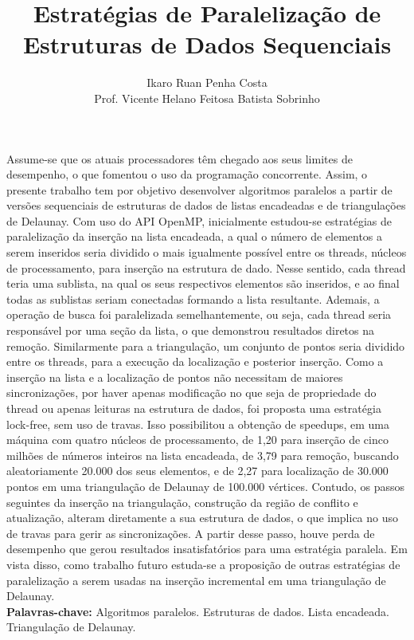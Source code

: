 \documentclass[a4paper, 12pt]{article}
\title{Estratégias de Paralelização de Estruturas de Dados Sequenciais}
\date{}
\author{Ikaro Ruan Penha Costa \\
	Prof. Vicente Helano Feitosa Batista Sobrinho}
\begin{document}
\maketitle

Assume-se que os atuais processadores têm chegado aos seus limites de desempenho, o que fomentou o uso da programação concorrente. 
Assim, o presente trabalho tem por objetivo desenvolver algoritmos paralelos a partir de versões sequenciais de estruturas de 
dados de listas encadeadas e de triangulações de Delaunay. Com uso do API OpenMP, inicialmente estudou-se estratégias de 
paralelização da inserção na lista encadeada, a qual o número de elementos a serem inseridos  seria dividido o mais igualmente 
possível entre os threads, núcleos de processamento, para inserção na estrutura de dado. Nesse sentido, cada thread teria uma sublista, 
na qual  os seus respectivos elementos são inseridos, e ao final todas as sublistas seriam conectadas formando a lista resultante. 
Ademais, a operação de busca foi paralelizada semelhantemente, ou seja, cada thread seria responsável por uma seção da lista, o 
que demonstrou resultados diretos na remoção.  Similarmente para a triangulação, um conjunto de pontos seria dividido entre os threads,
para a execução da localização e posterior inserção. Como a inserção na lista e a localização de pontos não necessitam de maiores 
sincronizações, por haver apenas modificação no que seja de propriedade do thread ou apenas leituras na estrutura de dados, 
foi proposta uma estratégia lock-free, sem uso de travas. Isso possibilitou a obtenção de speedups, em uma máquina com quatro 
núcleos de processamento, de 1,20 para inserção de cinco milhões de números inteiros na lista encadeada, de 3,79 para remoção, 
buscando aleatoriamente 20.000 dos seus elementos, e de 2,27 para localização de 30.000 pontos em uma triangulação de Delaunay 
de 100.000 vértices. Contudo, os passos seguintes da inserção na triangulação, construção da região de conflito e atualização,
alteram diretamente a sua estrutura de dados, o que implica no uso de travas para gerir as sincronizações. A partir desse passo,
houve perda de desempenho que gerou resultados insatisfatórios para uma estratégia paralela. Em vista disso, como trabalho futuro 
estuda-se a proposição de outras estratégias de paralelização a serem usadas na inserção incremental em uma triangulação de Delaunay. \\

\textbf{Palavras-chave:} Algoritmos paralelos. Estruturas de dados. Lista encadeada. Triangulação de Delaunay. \\
\end{document}
